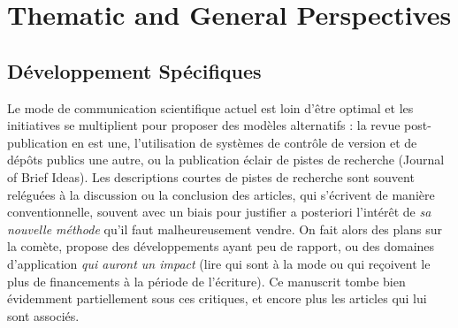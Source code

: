 



\chapter{Thematic and General Perspectives} %

\label{ch:opening} %




\headercit{}{}{}

\bigskip







\newpage


\section{Développement Spécifiques}



Le mode de communication scientifique actuel est loin d'être optimal %
et les initiatives se multiplient pour proposer des modèles alternatifs : la revue post-publication en est une, l'utilisation de systèmes de contrôle de version et de dépôts publics une autre, ou la publication éclair de pistes de recherche (Journal of Brief Ideas). %
Les descriptions courtes de pistes de recherche sont souvent reléguées à la discussion ou la conclusion des articles, qui s'écrivent de manière conventionnelle, souvent avec un biais pour justifier a posteriori l'intérêt de \emph{sa nouvelle méthode} qu'il faut malheureusement vendre. On fait alors des plans sur la comète, propose des développements ayant peu de rapport, ou des domaines d'application \emph{qui auront un impact} (lire qui sont à la mode ou qui reçoivent le plus de financements à la période de l'écriture). %
Ce manuscrit tombe bien évidemment partiellement sous ces critiques, et encore plus les articles qui lui sont associés.


